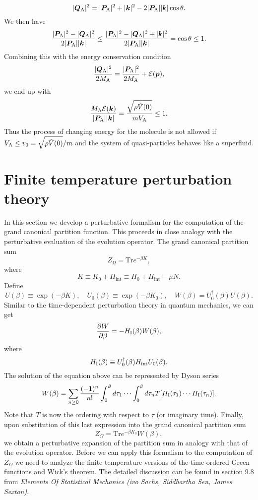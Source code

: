 \[|\bm{Q}_{\rm A}|^2 = |\bm{P}_{\rm A}|^2 + |\bm{k}|^2 - 2|\bm{P}_{\rm A}||\bm{k}|\cos\theta.\]
We then have
\[\frac{|\bm{P}_{\rm A}|^2-|\bm{Q}_{\rm A}|^2}{2|\bm{P}_{\rm A}| |\bm{k}|} \leq \frac{|\bm{P}_{\rm A}|^2-|\bm{Q}_{\rm A}|^2 + |\bm{k}|^2}{2|\bm{P}_{\rm A}| |\bm{k}|} = \cos\theta \leq 1.\]
Combining this with the energy conservation condition
\[\frac{|\bm{Q}_{\rm A}|^2}{2M_{\rm A}} = \frac{|\bm{P}_{\rm A}|^2}{2M_{\rm A}} + \mathcal{E}(\bm{p}),\]
we end up with
\[\frac{M_{\rm A}\mathcal{E}(\bm{k})}{|\bm{P}_{\rm A}| |\bm{k}|} = \frac{\sqrt{\rho \tilde{V}(0)}}{mV_{\rm A}} \leq 1.\]
Thus the process of changing energy for the molecule is not allowed if $V_{\rm A} \leq v_0 = \sqrt{\rho \tilde{V}(0)} / m $ and the system of quasi-particles behaves like a superfluid.

\section{Finite temperature perturbation theory}
In this section we develop a perturbative formalism for the computation of the grand canonical partition function. This proceeds in close analogy with the perturbative evaluation of the evolution operator. The grand canonical partition sum 
\[Z_{\Omega} = \mathrm{Tr}e^{-\beta K},\]
where
\[K \equiv K_0 + H_{\mathrm{int}} \equiv H_0 + H_{\mathrm{int}} -\mu N.\]
Define
\[U(\beta) \equiv \exp(-\beta K) , \quad U_0(\beta) \equiv \exp(-\beta K_0) , \quad W(\beta) = U_0^{\dagger}(\beta)U(\beta).\]
Similar to the time-dependent perturbation theory in quantum mechanics, we can get
\[\frac{\partial W}{\partial \beta} = -H_{\rm I}(\beta)W(\beta),\]
where
\[H_{\rm I}(\beta) \equiv U_0^{\dagger}(\beta)H_{\mathrm{int}}U_0(\beta).\]
The solution of the equation above can be represented by Dyson series
\[W(\beta) = \sum_{n \geq 0} \frac{(-1)^n}{n!} \int_0^{\beta}d\tau_1 \cdots \int_0^{\beta} d\tau_n T[H_{\rm I}(\tau_1)\cdots H_{\rm I}(\tau_n)].\]
Note that $T$ is now the ordering with respect to $\tau$ (or imaginary time). Finally, upon substitution of this last expression into the grand canonical partition sum
\[Z_{\Omega} = \mathrm{Tr} e^{-\beta K_0}W(\beta),\]
we obtain a perturbative expansion of the partition sum in analogy with that of the evolution operator. Before we can apply this formalism to the computation of $Z_{\Omega}$ we need to analyze the finite temperature versions of the time-ordered Green functions and Wick's theorem. The detailed discussion can be found in section 9.8 from \emph{Elements Of Statistical Mechanics (ivo Sachs, Siddhartha Sen, James Sexton)}.

